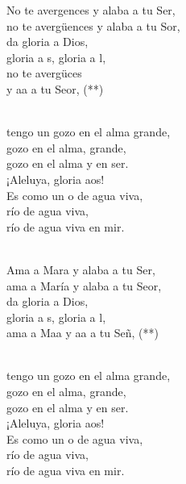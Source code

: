 \documentclass[12pt]{article}
\begin{document}
\begin{multicols*}{2}
\begin{cancion}
\jump
	No te avergences y alaba a tu Ser,\\
	no te avergüences y alaba a tu Sor, \\
da gloria a Dios,\\
	gloria a s, gloria a l,\\
	no te avergüces  \\
	y aa a tu Seor, (**)\\\jump\\
	\begin{chorus}%
	 tengo un gozo en el alma grande,\\
gozo en el alma, grande,\\
	gozo en el alma y en ser.\\
	¡Aleluya, gloria aos!\\
	Es como un o de agua viva, \\
río de agua viva,\\
	río de agua viva en mir. \\
	\end{chorus}%
	\jump\\
	Ama a Mara y alaba a tu Ser,\\
	ama a María y alaba a tu Seor,\\
da gloria a Dios,\\
	gloria a s, gloria a l,\\
	ama a Maa y aa a tu Señ, (**)  \\\jump\\
	\begin{chorus}%
	 tengo un gozo en el alma grande,\\
gozo en el alma, grande,\\
	gozo en el alma y en ser.\\
	¡Aleluya, gloria aos!\\
	Es como un o de agua viva, \\
río de agua viva,\\
	río de agua viva en mir. \\
	\end{chorus}%
	\jump\\
\end{cancion}%


\end{multicols*}
\end{document}
